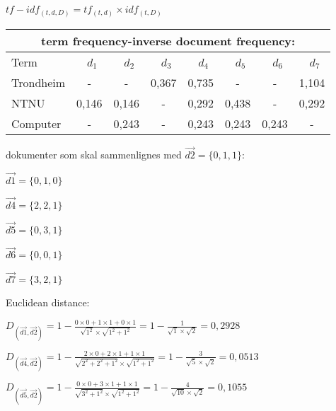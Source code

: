 \documentclass[]{article}
\begin{document}
\begin{center}
$tf-idf_{(t,d,D)} = tf_{(t,d)} \times idf_{(t,D)}$
\vspace{5 mm}

\begin{tabular}[t]{|l|ccccccc|}

\multicolumn{8}{c}{term frequency-inverse document frequency:}\\\hline

Term&\ $d_1$&\ $d_2$&\ $d_3$&\ $d_4$&\ $d_5$&\ $d_6$&\ $d_7$\\\hline

Trondheim&-&-&0,367&0,735&-&-&1,104\\


NTNU&0,146&0,146&-&0,292&0,438&-&0,292\\

Computer&-&0,243&-&0,243&0,243&0,243&-\\\hline
\end{tabular}
\end{center}

\vspace{10 mm}
dokumenter som skal sammenlignes med $\overrightarrow{d2} = \{0,1,1\}$:
\vspace{2 mm}

\indent\indent$\overrightarrow{d1} = \{0,1,0\}$

\indent\indent$\overrightarrow{d4} = \{2,2,1\}$

\indent\indent$\overrightarrow{d5} = \{0,3,1\}$

\indent\indent$\overrightarrow{d6} = \{0,0,1\}$

\indent\indent$\overrightarrow{d7} = \{3,2,1\}$

\vspace{10 mm}

Euclidean distance:
\vspace{2 mm}
 	
$D_{(\overrightarrow{d1},\overrightarrow{d2})} = 1- \frac{0\times0+1\times1+0\times1}{\sqrt{1^2}\times\sqrt{1^2+1^2}} = 1 - \frac{1}{\sqrt{1}\times\sqrt{2}} = 0,2928$
\vspace{2 mm}

$D_{(\overrightarrow{d4},\overrightarrow{d2})} = 1 - \frac{2\times0+2\times1+1\times1}{\sqrt{2^2+2^2+1^2}\times\sqrt{1^2+1^2}} = 1 - \frac{3}{\sqrt{5}\times\sqrt{2}} = 0,0513$
\vspace{2 mm}

$D_{(\overrightarrow{d5},\overrightarrow{d2})} = 1 - \frac{0\times0+3\times1+1\times1}{\sqrt{3^2+1^2}\times\sqrt{1^2+1^2}} = 1 - \frac{4}{\sqrt{10}\times\sqrt{2}} = 0,1055$
\vspace{2 mm}
\end{document}
